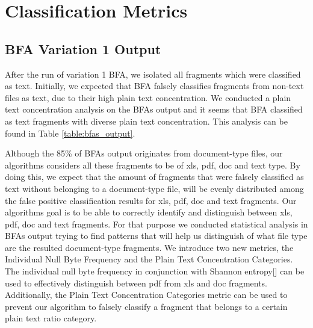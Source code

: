 \chapter{Classification  Metrics}
\section{BFA Variation 1 Output}
After the run of variation 1 BFA, we isolated all fragments which were classified as text. Initially, we expected that BFA falsely classifies fragments from non-text files as text, due to their high plain text concentration. We conducted a plain text concentration analysis on the BFAs output and it seems that BFA classified as text fragments with diverse plain text concentration. This analysis can be found in Table \ref{table:bfas_output}.


 Although the 85\% of BFAs output  originates from document-type files, our algorithms considers all these fragments to be of xls, pdf, doc and text type. By doing this, we expect that the amount of fragments that were falsely classified as text without belonging to a document-type file, will be evenly distributed among the false positive classification results for xls, pdf, doc and text fragments. Our algorithms goal is to be able to correctly identify and distinguish between xls, pdf, doc and text fragments. For that purpose we conducted statistical analysis in BFAs output trying to find patterns that will help us distinguish of what file type are the resulted document-type fragments. We introduce two new metrics, the Individual Null Byte Frequency and the Plain Text Concentration Categories.  The individual null byte frequency in conjunction with Shannon entropy[] can be used to effectively distinguish  between pdf from xls and doc fragments. Additionally, the Plain Text Concentration Categories metric can be used to prevent our algorithm to falsely classify a fragment that belongs to a certain plain text ratio category.


